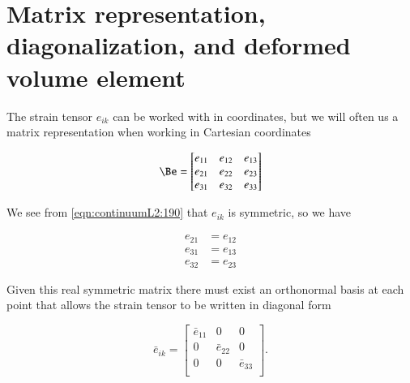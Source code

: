 % 
% 
% 
% 
% 
% 
% 
% 
% 
% 
% 
% 


\section{Matrix representation, diagonalization, and deformed volume element}

The strain tensor $e_{ik}$ can be worked with in coordinates, but we will often us a matrix representation when working in Cartesian coordinates 

\begin{equation}\label{eqn:continuumL2:210}
\Be = 
\begin{bmatrix}
e_{11} & e_{12} & e_{13} \\
e_{21} & e_{22} & e_{23} \\
e_{31} & e_{32} & e_{33} \\
\end{bmatrix}
\end{equation}

We see from \ref{eqn:continuumL2:190} that $e_{ik}$ is symmetric, so we have

\begin{align}\label{eqn:continuumL2:230}
e_{21} &= e_{12} \\
e_{31} &= e_{13} \\
e_{32} &= e_{23}
\end{align}

Given this real symmetric matrix there must exist an orthonormal basis at each point that allows the strain tensor to be written in diagonal form 

\begin{equation}\label{eqn:continuumL2:250}
\bar{e}_{ik} =
\begin{bmatrix}
\bar{e}_{11} & 0 & 0 \\
0 & \bar{e}_{22} & 0 \\
0 & 0 & \bar{e}_{33} \\
\end{bmatrix}.
\end{equation}

